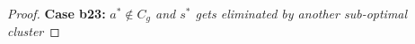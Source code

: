 \begin{proof}

\textbf{Case b23:} \textit{$a^{*}\notin C_{g}$ and $s^{*}$ gets eliminated by another sub-optimal cluster} 


\end{proof}
